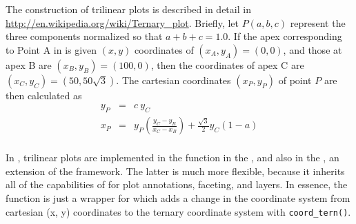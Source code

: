 \documentclass[10pt,krantz2]{krantz}\usepackage[]{graphicx}\usepackage[]{color}
\begin{document}
The construction of trilinear plots is described in detail
in \url{http://en.wikipedia.org/wiki/Ternary_plot}.
Briefly, let $P(a, b, c)$ represent the three components  normalized so
that $a + b + c = 1.0$.
If the apex corresponding to Point A in 
is given $(x, y)$ coordinates of $(x_A, y_A) = (0, 0)$,
and those at apex B are $(x_B, y_B) = (100, 0)$,
then the coordinates of apex C are $(x_C, y_C) = (50, 50\sqrt{3})$.
The cartesian coordinates $(x_P, y_P)$  of point $P$ are then calculated as
\begin{eqnarray*}
y_P & = & c \: y_C \\
x_P & = & y_P \left( \frac{y_C - y_B}{x_C - x_B} \right)
+ \frac{\sqrt{3}}{2} y_C (1 - a) \\
\end{eqnarray*}

In \R, trilinear plots are implemented in the
 function in the ,
and also in the , an extension of
the  framework.  The latter is much more
flexible, because it inherits all of the capabilities
of  for plot annotations, faceting, and layers.
In essence,
the function  is just a wrapper for
 which adds a change in the coordinate
system from cartesian (x, y) coordinates to the
ternary coordinate system with \verb|coord_tern()|.
\end{document}
